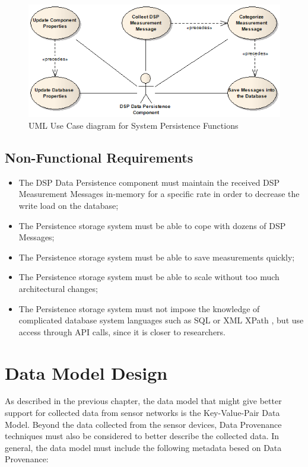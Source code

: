 \begin{figure}[!b]
  \centering
  \includegraphics[scale=0.5]{../diagrams/DSP-Data-Persistence-UseCases-Diagram-System}
  \caption{UML Use Case diagram for System Persistence Functions}
  \label{fig:DSP-Data-Persistence-UseCases-Diagram-System}
\end{figure}

\subsection{Non-Functional Requirements}

\begin{itemize}
  \item The DSP Data Persistence component must maintain the received DSP
  Measurement Messages in-memory for a specific rate in order to decrease the
  write load on the database;
  \item The Persistence storage system must be able to cope with dozens of DSP
  Messages;
  \item The Persistence storage system must be able to save measurements quickly;
  \item The Persistence storage system must be able to scale without too much
  architectural changes;
  \item The Persistence storage system must not impose the knowledge of
  complicated database system languages such as SQL \cite{sql} or XML XPath
  \cite{xml-xpath}, but use access through API calls, since it is closer to
  researchers.
\end{itemize}

\section{Data Model Design}
\label{sec:dsp-persistence-data-model}
As described in the previous chapter, the data model that might give better
support for collected data from sensor networks is the Key-Value-Pair Data
Model. Beyond the data collected from the sensor devices, Data Provenance 
techniques must also be considered to better describe the collected data. In
general, the data model must include the following metadata besed on Data
Provenance:

